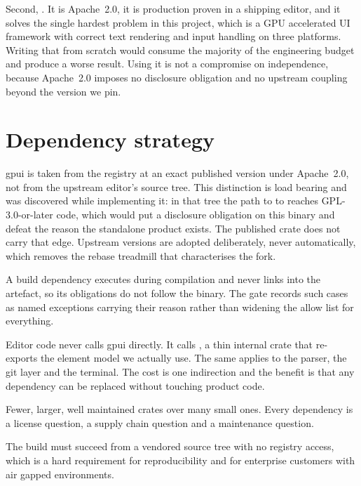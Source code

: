 Second, . It is Apache~2.0, it is production proven
in a shipping editor, and it solves the single hardest problem in this project, which is a
GPU accelerated UI framework with correct text rendering and input handling on three
platforms. Writing that from scratch would consume the majority of the engineering budget
and produce a worse result. Using it is not a compromise on independence, because Apache~2.0
imposes no disclosure obligation and no upstream coupling beyond the version we pin.

\section{Dependency strategy}

\begin{description}[style=nextline,leftmargin=0pt]
  \item[Pin the UI framework to its published release.] gpui is taken from the registry at an
  exact published version under Apache~2.0, not from the upstream editor's source tree. This
  distinction is load bearing and was discovered while implementing it: in that tree the path
   to  to  reaches GPL-3.0-or-later code, which would
  put a disclosure obligation on this binary and defeat the reason the standalone product
  exists. The published crate does not carry that edge. Upstream versions are adopted
  deliberately, never automatically, which removes the rebase treadmill that characterises the
  fork.

  \item[Judge a dependency by whether it ships.] A build dependency executes during
  compilation and never links into the artefact, so its obligations do not follow the binary.
  The gate records such cases as named exceptions carrying their reason rather than widening
  the allow list for everything.

  \item[Wrap every third party boundary.] Editor code never calls gpui directly. It calls
  , a thin internal crate that re-exports the element model we actually use.
  The same applies to the parser, the git layer and the terminal. The cost is one indirection
  and the benefit is that any dependency can be replaced without touching product code.

  \item[Prefer boring dependencies.] Fewer, larger, well maintained crates over many small
  ones. Every dependency is a license question, a supply chain question and a maintenance
  question.

  \item[No network dependency at build time.] The build must succeed from a vendored source
  tree with no registry access, which is a hard requirement for reproducibility and for
  enterprise customers with air gapped environments.
\end{description}

